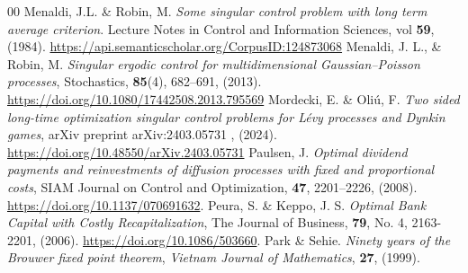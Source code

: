 \documentclass{article}
\begin{document}
\begin{thebibliography}{00}
%
Menaldi, J.L. \& Robin, M. \textit{Some singular control problem with long term average criterion}. Lecture Notes in Control and Information Sciences, vol \textbf{59}, (1984).
\url{https://api.semanticscholar.org/CorpusID:124873068}
Menaldi, J. L., \& Robin, M. \textit{Singular ergodic control for multidimensional Gaussian–Poisson processes}, Stochastics, \textbf{85}(4), 682–691, (2013). \url{https://doi.org/10.1080/17442508.2013.795569}
Mordecki, E. \& Oli\'u, F. \textit{Two sided long-time optimization singular control problems for Lévy processes and Dynkin games}, 
arXiv preprint arXiv:2403.05731 , (2024).  \
\url{ 	https://doi.org/10.48550/arXiv.2403.05731}
Paulsen, J. \textit{Optimal dividend payments and reinvestments of diffusion processes with fixed
and proportional costs}, SIAM Journal on Control and Optimization, \textbf{47}, 2201–2226, (2008).
\url{https://doi.org/10.1137/070691632}.
\bibitem[Peura and Keppo(2006)]{BK}
Peura, S. \& Keppo, J. S. \textit{Optimal Bank Capital with Costly Recapitalization}, The Journal of Business, \textbf{79}, No. 4, 2163-2201, (2006). 
\url{https://doi.org/10.1086/503660}.
Park \& Sehie. \textit{Ninety years of the Brouwer fixed point theorem}, \textit{Vietnam Journal of Mathematics}, \textbf{27}, (1999). 
%

\end{thebibliography}
\end{document}
